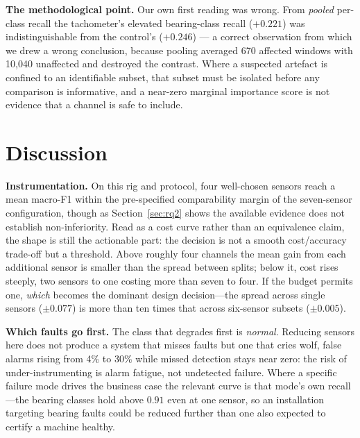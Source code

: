 \documentclass[conference]{IEEEtran}
\begin{document}
\textbf{The methodological point.} Our own first reading was wrong. From
\emph{pooled} per-class recall the tachometer's elevated bearing-class recall
($+0.221$) was indistinguishable from the control's ($+0.246$) --- a correct
observation from which we drew a wrong conclusion, because pooling averaged
670 affected windows with 10{,}040 unaffected and destroyed the contrast.
Where a suspected artefact is confined to an identifiable subset, that subset
must be isolated before any comparison is informative, and a near-zero
marginal importance score is not evidence that a channel is safe to include.

\section{Discussion}

\textbf{Instrumentation.} On this rig and protocol, four well-chosen sensors
reach a mean macro-F1 within the pre-specified comparability margin of the
seven-sensor configuration, though as Section~\ref{sec:rq2} shows the
available evidence does not establish non-inferiority. Read as a cost curve
rather than an equivalence claim, the shape is still the actionable part: the
decision is not a smooth cost/accuracy trade-off but a threshold. Above
roughly four channels the mean gain from each additional sensor is smaller
than the spread between splits; below it, cost rises steeply, two sensors to
one costing more than seven to four. If the budget permits one, \emph{which}
becomes the dominant design decision---the spread across single sensors
($\pm0.077$) is more than ten times that across six-sensor subsets
($\pm0.005$).

\textbf{Which faults go first.} The class that degrades first is \emph{normal}.
Reducing sensors here does not produce a system that misses faults but one that
cries wolf, false alarms rising from 4\% to 30\% while missed detection stays
near zero: the risk of under-instrumenting is alarm fatigue, not undetected
failure. Where a specific failure mode drives the business case the relevant
curve is that mode's own recall---the bearing classes hold above $0.91$ even at
one sensor, so an installation targeting bearing faults could be reduced
further than one also expected to certify a machine healthy.
\end{document}
